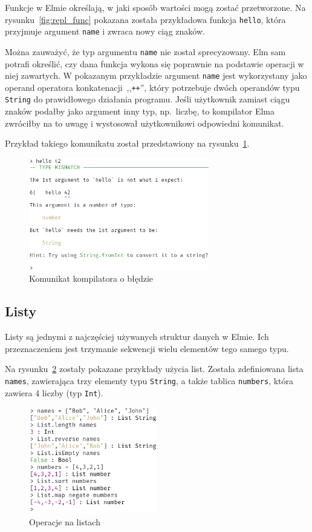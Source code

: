 \documentclass[twoside,a4paper]{report}
\begin{document}
Funkcje w Elmie określają, w jaki sposób wartości mogą zostać przetworzone.
Na rysunku~\ref{fig:repl_func} pokazana została przykładowa funkcja \texttt{hello}, która przyjmuje argument \texttt{name} i zwraca nowy ciąg znaków.

Można zauważyć, że typ argumentu \texttt{name} nie został sprecyzowany.
Elm sam potrafi określić, czy dana funkcja wykona się poprawnie na podstawie operacji w niej zawartych.
W pokazanym przykładzie argument \texttt{name} jest wykorzystany jako operand operatora konkatenacji~,,\texttt{++}'', który potrzebuje dwóch operandów typu \texttt{String} do prawidłowego działania programu.
Jeśli użytkownik zamiast ciągu znaków podałby jako argument inny typ, np.~liczbę, to kompilator Elma zwróciłby na to uwagę i wystosował użytkownikowi odpowiedni komunikat.

Przykład takiego komunikatu został przedstawiony na rysunku~\ref{fig:repl_error}.

\begin{figure}[H]
    \centering
    \includegraphics[width=0.7\textwidth]{img/repl_error}
    \caption{Komunikat kompilatora o błędzie}\label{fig:repl_error}
\end{figure}

\subsection{Listy}
Listy są jednymi z najczęściej używanych struktur danych w Elmie.
Ich przeznaczeniem jest trzymanie sekwencji wielu elementów tego samego typu.

Na rysunku~\ref{fig:repl_lists} zostały pokazane przykłady użycia list. Została zdefiniowana lista \texttt{names}, zawierająca trzy elementy typu \texttt{String}, a także tablica \texttt{numbers}, która zawiera 4 liczby (typ \texttt{Int}).

\begin{figure}[H]
    \centering
    \includegraphics[width=0.5\textwidth]{img/repl_lists}
    \caption{Operacje na listach}\label{fig:repl_lists}
\end{figure}
\end{document}
